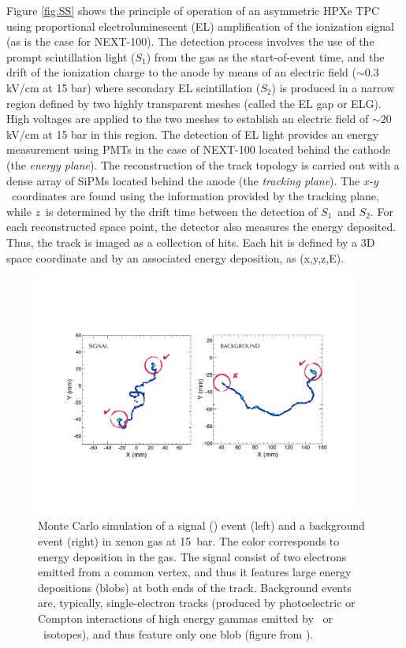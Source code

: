 \documentclass[a4paper,11pt]{article}
\begin{document}
Figure \ref{fig.SS} shows the principle of operation of an asymmetric HPXe TPC using proportional electroluminescent (EL) amplification of the ionization signal (as is the case for NEXT-100). The detection process involves the use of the prompt scintillation light ($S_1$) from the gas as the start-of-event time, and the drift of the ionization charge to the anode by means of an electric field ($\sim0.3$ kV/cm at 15 bar) where secondary EL scintillation ($S_2$) is produced in a narrow region defined by two highly transparent meshes (called the EL gap or ELG).  High voltages are applied to the two meshes to establish an electric field of $\sim 20$ kV/cm at 15 bar in this region. The detection of EL light provides an energy measurement using PMTs in the case of NEXT-100 located behind the cathode (the \emph{energy plane}). The reconstruction of the track topology is carried out with a dense array of SiPMs located behind the anode (the \emph{tracking plane}). The $x$-$y$~coordinates are found using the information provided by the tracking plane, while $z$~is determined by the drift time between the detection of $S_1$~and $S_2$. For each reconstructed space point, the detector also measures the energy deposited. Thus, the track is imaged as a collection of hits. Each hit is defined by a 3D space coordinate and by an associated energy deposition, as (x,y,z,E).

\begin{figure}[!htb]
\centering
\includegraphics[width= 0.95\textwidth]{fig/TrackSignature.pdf}
\caption{Monte Carlo simulation of a signal (\bbonu) event (left) and a  background event (right) in xenon gas at 15~bar. The color corresponds to energy deposition in the gas. The signal consist of two electrons emitted from a common vertex, and thus it features large energy depositions  (blobs) at both ends of the track. Background events are, typically, single-electron tracks (produced by photoelectric or Compton interactions of high energy gammas emitted by \BI\ or \TL\ isotopes), and thus feature only one blob (figure from \cite{MartinAlbo_thesis}).} \label{fig.ETRK2}
\end{figure}
\end{document}
